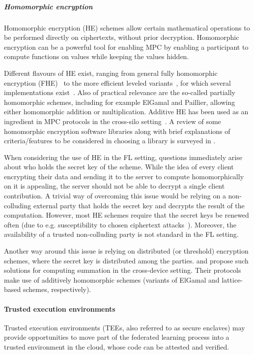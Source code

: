 \subparagraph{Homomorphic encryption}
Homomorphic encryption (HE) schemes allow certain mathematical operations to be performed directly on ciphertexts, without prior decryption.  Homomorphic encryption can be a powerful tool for enabling MPC by enabling a participant to compute functions on values while keeping the values hidden.

Different flavours of HE exist, ranging from general fully homomorphic encryption (FHE)~\cite{gentry2009fully} to the more efficient leveled variants~\cite{BFV1, BFV2, BGV, DBLP:conf/pkc/CoronLT14}, for which several implementations exist~\cite{HElib, SEAL, Palisade, SHELL, lattigo}. Also of practical relevance are the so-called partially homomorphic schemes, including for example ElGamal and Paillier, allowing either homomorphic addition or multiplication. Additive HE has been used as an ingredient in MPC protocols in the cross-silo setting~\cite{DBLP:conf/sp/NikolaenkoWIJBT13, Hardy2017-da}.
A review of some homomorphic encryption software libraries along with brief explanations of criteria/features to be considered in choosing a library is surveyed in \cite{sathya2018review}.\par
When considering the use of HE in the FL setting, questions immediately arise about
who holds the secret key of the scheme. While the idea of every client encrypting 
their data and sending it to the server to compute homomorphically 
on it is appealing, the server should not be able to decrypt a single client contribution.
A trivial way of overcoming this issue would be relying on a non-colluding external
party that holds the secret key and decrypts the result of the computation.
However, most HE schemes require that the secret keys be renewed often (due to e.g. susceptibility to chosen ciphertext attacks~\cite{DBLP:conf/latincrypt/ChenalT14}). Moreover, the availability of a trusted non-colluding 
party is not standard in the FL setting. 

Another way around this issue is relying on distributed (or threshold) encryption schemes, where the secret key is distributed among the parties. \citet{hatelove} and \citet{DBLP:conf/sosp/RothNFH19} propose such solutions for computing summation in the cross-device setting. Their protocols make use of additively homomorphic schemes (variants of ElGamal and lattice-based schemes, respectively).

\paragraph{Trusted execution environments}
Trusted execution environments (TEEs, also referred to as secure enclaves) may provide opportunities to move part of the federated learning process into a trusted environment in the cloud, whose code can be attested and verified.


